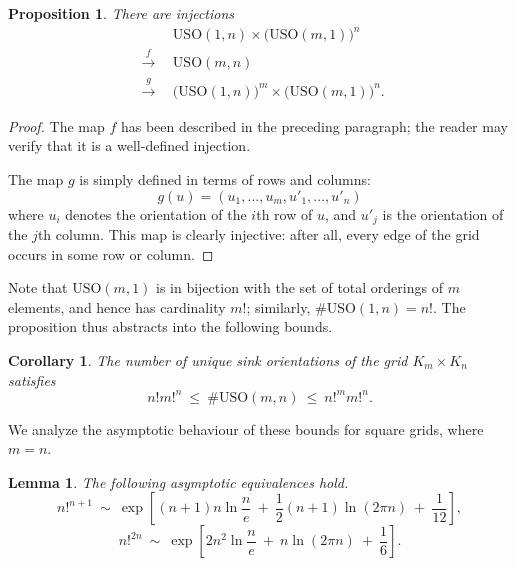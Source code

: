 \documentclass[a4paper,10pt]{article}
\newtheorem{lemma}{Lemma}
\newtheorem{corollary}{Corollary}
\newtheorem{prop}{Proposition}
\newcommand{\USO}{\ensuremath{\mathrm{USO}}}
\begin{document}
\begin{prop}
    There are injections
    \begin{align*}
        &
        \USO(1,n) \times \bigl( \USO(m,1) \bigr)^n
        \\
        ~~\stackrel{f}{\longrightarrow}~~
        &
        \USO(m,n)
        \\
        ~~\stackrel{g}{\longrightarrow}~~
        &
        \bigl( \USO(1,n) \bigr)^m \times \bigl( \USO(m,1) \bigr)^n .
    \end{align*}
\end{prop}

\begin{proof}
    The map $f$ has been described in the preceding paragraph; the reader may
    verify that it is a well-defined injection.

    The map $g$ is simply defined in terms of rows and columns:
    \[ g(u) = (u_1, \dots, u_m, u'_1, \dots, u'_n) \]
    where $u_i$ denotes the orientation of the $i$th row of $u$, and $u'_j$ is
    the orientation of the $j$th column.
    This map is clearly injective: after all, every edge of the grid occurs in
    some row or column.
\end{proof}

Note that $\USO(m,1)$ is in bijection with the set of total orderings of $m$
elements, and hence has cardinality $m!$; similarly, $\#\USO(1,n) = n!$.
The proposition thus abstracts into the following bounds.

\begin{corollary}
    \label{cor:num-USO-mn}
    The number of unique sink orientations of the grid
    $K_m \times K_n$ satisfies
    \[
        n! m!^n ~\le~ \#\USO(m,n) ~\le~ n!^m m!^n.
    \]
\end{corollary}

\noindent
We analyze the asymptotic behaviour of these bounds for square grids, where
$m=n$.

\begin{lemma}
    \label{lem:asymptotics-USO-mn}
    The following asymptotic equivalences hold.
    \[
        n!^{n+1} ~\sim~
            \exp \left[
                (n+1) n \ln \frac{n}{e} ~+~ \frac{1}{2} (n+1) \ln (2 \pi n) ~+~ \frac{1}{12}
            \right],
    \]
    \[
        n!^{2n} ~\sim~
        \exp \left[
            2n^2 \ln \frac{n}{e} ~+~ n \ln (2 \pi n) ~+~ \frac{1}{6}
        \right].
    \]
\end{lemma}
\end{document}

